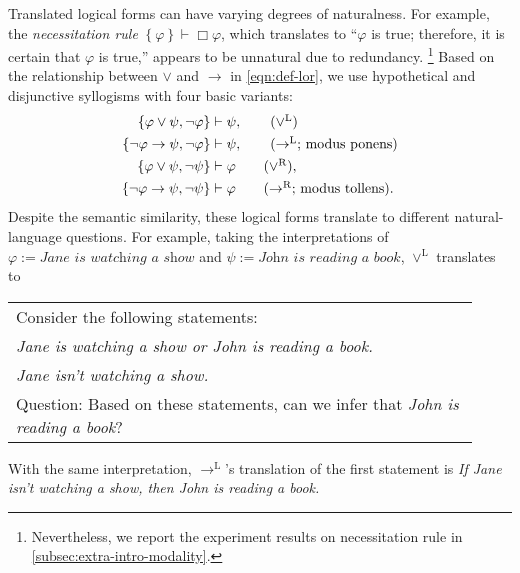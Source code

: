 Translated logical forms can have varying degrees of naturalness.
For example, the \textit{necessitation rule} \(\left\{\varphi\right\} \vdash \Box \varphi \), which translates to ``\(\varphi\) is true; therefore, it is certain that \(\varphi\) is true,'' appears to be unnatural due to redundancy.
\footnote{Nevertheless, we report the experiment results on necessitation rule in \cref{subsec:extra-intro-modality}.}
Based on the relationship between $\lor$ and $\to$ in \cref{eqn:def-lor}, we use hypothetical and disjunctive syllogisms with four basic variants:
\begin{align}
    \left\{\varphi \lor \psi, \lnot \varphi\right\} & \vdash \psi, \tag{$\lor^\mathrm{L}$} \label{eqn:inf-rule-or-left}                      \\
    \{\lnot \varphi \to \psi, \lnot \varphi\}       & \vdash \psi, \tag{$\to^{\mathrm{L}}$; modus ponens}   \label{eqn:inf-rule-imply-left}  \\
    \{\varphi \lor \psi , \lnot \psi\}              & \vdash \varphi \tag{$\lor^\mathrm{R}$}, \label{eqn:inf-rule-or-right}                  \\
    \{\lnot \varphi \to \psi, \lnot \psi\}          & \vdash \varphi \tag{$\to^\mathrm{R}$; modus tollens}. \label{eqn:inf-rule-imply-right}
\end{align}
Despite the semantic similarity, these logical forms translate to different natural-language questions.
For example, taking the interpretations of $\varphi := \textit{Jane is watching a show}$ and $\psi := \textit{John is reading a book}$, $\lor^\mathrm{L}$ translates to
\begin{table}[H]
    \vspace{-5pt}
    \begin{tabular}{p{0.92\linewidth}}
        Consider the following statements:                          \\
        \textit{Jane is watching a show or John is reading a book.} \\
        \textit{Jane isn't watching a show.}                        \\
        Question: Based on these statements, can we infer that \textit{John is reading a book}?
    \end{tabular}
    \vspace{-10pt}
\end{table}
\noindent With the same interpretation, $\to^\mathrm{L}$'s translation of the first statement is \textit{If Jane isn't watching a show, then John is reading a book.}

